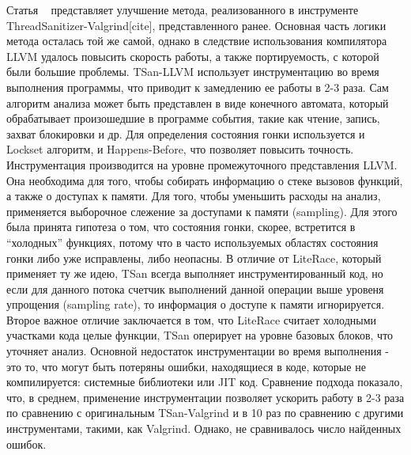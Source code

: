Статья ~\cite{Serebryany:2011} представляет улучшение метода, реализованного в инструменте ThreadSanitizer-Valgrind[cite], представленного ранее. Основная часть логики метода осталась той же самой, однако в следствие использования компилятора LLVM удалось повысить скорость работы, а также портируемость, с которой были большие проблемы. 
TSan-LLVM использует инструментацию во время выполнения программы, что приводит к замедлению ее работы в 2-3 раза. Сам алгоритм анализа может быть представлен в виде конечного автомата, который обрабатывает произошедшие в программе события, такие как чтение, запись, захват блокировки и др. Для определения состояния гонки используется и Lockset алгоритм, и Happens-Before, что позволяет повысить точность. 
Инструментация производится на уровне промежуточного представления LLVM. Она необходима для того, чтобы собирать информацию о стеке вызовов функций, а также о доступах к памяти. 
Для того, чтобы уменьшить расходы на анализ, применяется выборочное слежение за доступами к памяти (sampling). Для этого была принята гипотеза о том, что состояния гонки, скорее, встретится в “холодных” функциях, потому что в часто используемых областях состояния гонки либо уже исправлены, либо неопасны. В отличие от LiteRace, который применяет ту же идею, TSan всегда выполняет инструментированный код, но если для данного потока счетчик выполнений данной операции выше уровеня упрощения (sampling rate), то информация о доступе к памяти игнорируется. Второе важное отличие заключается в том, что LiteRace считает холодными участками кода целые функции, TSan оперирует на уровне базовых блоков, что уточняет анализ.
Основной недостаток инструментации во время выполнения - это то, что могут быть потеряны ошибки, находящиеся в коде, которые не компилируется: системные библиотеки или JIT код. 
Сравнение подхода показало, что, в среднем, применение инструментации позволяет ускорить работу в 2-3 раза по сравнению с оригинальным TSan-Valgrind и в 10 раз по сравнению с другими инструментами, такими, как Valgrind. Однако, не сравнивалось число найденных ошибок. 

